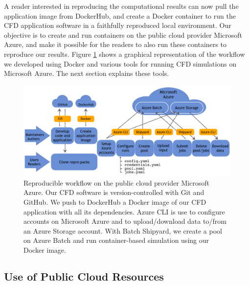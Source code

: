 \documentclass[10pt,journal,compsoc]{IEEEtran}
\begin{document}
\noindent A reader interested in reproducing the computational results can now pull the application image from DockerHub, and create a Docker container to run the CFD application software in a faithfully reproduced local environment.
Our objective is to create and run containers on the public cloud provider Microsoft Azure, and make it possible for the readers to also run these containers to reproduce our results.
Figure \ref{fig:cloud_workflow} shows a graphical representation of the workflow we developed using Docker and various tools for running CFD simulations on Microsoft Azure.
The next section explains these tools.

\begin{figure}[t]
    \centering
    \includegraphics[width=16cm]{figures/cloud_workflow.png}
    \caption{Reproducible workflow on the public cloud provider Microsoft Azure. Our CFD software is version-controlled with Git and GitHub. We push to DockerHub a Docker image of our CFD application with all its dependencies. Azure CLI is use to configure accounts on Microsoft Azure and to upload/download data to/from an Azure Storage account. With Batch Shipyard, we create a pool on Azure Batch and run container-based simulation using our Docker image.}
    \label{fig:cloud_workflow}
\end{figure}

\subsection{Use of Public Cloud Resources}
\end{document}
